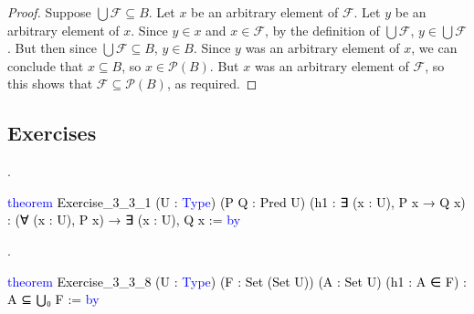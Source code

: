 \documentclass[
  letterpaper,
  DIV=11,
  numbers=noendperiod]{scrreprt}
\makeatletter
\newenvironment{Shaded}{\begin{snugshade}}{\end{snugshade}}
\newcommand{\KeywordTok}[1]{\textcolor[rgb]{0.00,0.23,0.31}{#1}}
\newcommand{\NormalTok}[1]{\textcolor[rgb]{0.00,0.23,0.31}{#1}}
\newcommand{\SpecialCharTok}[1]{\textcolor[rgb]{0.37,0.37,0.37}{#1}}
\newcommand{\WarningTok}[1]{\textcolor[rgb]{0.37,0.37,0.37}{\textit{#1}}}
\def\redsquiggly{\bgroup \markoverwith{\textcolor{red}{\lower3.5\p@\hbox{\sixly \char58}}}\ULon}
\renewcommand{\NormalTok}[1]{\textcolor[HTML]{000000}{#1}}
\renewcommand{\KeywordTok}[1]{\textcolor[HTML]{0000FF}{#1}}
\renewcommand{\SpecialCharTok}[1]{}
\renewcommand{\WarningTok}[1]{\redsquiggly{\textcolor[HTML]{0000FF}{#1}}}
\newcommand{\nobreakShaded}{\renewenvironment{Shaded}
	{\begin{tcolorbox}[frame hidden, enhanced, interior hidden, boxrule=0pt,
		borderline west={3pt}{0pt}{shadecolor}, sharp corners]}
	{\end{tcolorbox}}}
\newenvironment{numex}[1]
	{\begin{minipage}[t]{0.04\textwidth}\vspace{8pt}{#1}.
		\end{minipage}\nobreakShaded\begin{minipage}[t]{0.96\textwidth}\vspace{0pt}}
	{\end{minipage}}
\newcommand{\excl}[1]{}
\theoremstyle{remark}
\makeatother
\begin{document}
\begin{proof}

Suppose \(\bigcup \mathcal{F} \subseteq B\). Let \(x\) be an arbitrary
element of \(\mathcal{F}\). Let \(y\) be an arbitrary element of \(x\).
Since \(y \in x\) and \(x \in \mathcal{F}\), by the definition of
\(\bigcup \mathcal{F}\), \(y \in \bigcup \mathcal{F}\). But then since
\(\bigcup \mathcal{F} \subseteq B\), \(y \in B\). Since \(y\) was an
arbitrary element of \(x\), we can conclude that \(x \subseteq B\), so
\(x \in \mathscr{P}(B)\). But \(x\) was an arbitrary element of
\(\mathcal{F}\), so this shows that
\(\mathcal{F} \subseteq \mathscr{P}(B)\), as required. \excl{~□}\qedhere

\end{proof}

\hypertarget{exercises-1}{%
\subsection{Exercises}\label{exercises-1}}

\begin{numex}{1}

\begin{Shaded}
\begin{Highlighting}[]
\KeywordTok{theorem}\NormalTok{ Exercise\_3\_3\_1}
\NormalTok{    (U : }\KeywordTok{Type}\NormalTok{) (P Q : Pred U) (h1 : ∃ (x : U), P x → Q x) :}
\NormalTok{    (∀ (x : U), P x) → ∃ (x : U), Q x := }\KeywordTok{by}
  
  \SpecialCharTok{**}\WarningTok{done}\SpecialCharTok{::}
\end{Highlighting}
\end{Shaded}

\end{numex}

\begin{numex}{2}

\begin{Shaded}
\begin{Highlighting}[]
\KeywordTok{theorem}\NormalTok{ Exercise\_3\_3\_8 (U : }\KeywordTok{Type}\NormalTok{) (F : Set (Set U)) (A : Set U)}
\NormalTok{    (h1 : A ∈ F) : A ⊆ ⋃₀ F := }\KeywordTok{by}
  
  \SpecialCharTok{**}\WarningTok{done}\SpecialCharTok{::}
\end{Highlighting}
\end{Shaded}

\end{numex}
\end{document}
